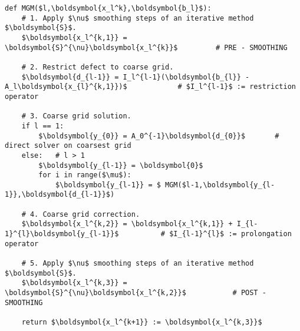 \documentclass{article}
\begin{document}
\pagestyle{plain}
\lstset{language=Python}
\begin{lstlisting}[mathescape=true]
def MGM($l,\boldsymbol{x_l^k},\boldsymbol{b_l}$): 
	# 1. Apply $\nu$ smoothing steps of an iterative method $\boldsymbol{S}$.
	$\boldsymbol{x_l^{k,1}} = \boldsymbol{S}^{\nu}\boldsymbol{x_l^{k}}$			# PRE - SMOOTHING
	
	# 2. Restrict defect to coarse grid.
	$\boldsymbol{d_{l-1}} = I_l^{l-1}(\boldsymbol{b_{l}} - A_l\boldsymbol{x_{l}^{k,1}})$			# $I_l^{l-1}$ := restriction operator
	
	# 3. Coarse grid solution.
	if l == 1:
		$\boldsymbol{y_{0}} = A_0^{-1}\boldsymbol{d_{0}}$ 		# direct solver on coarsest grid
	else:	# l > 1
		$\boldsymbol{y_{l-1}} = \boldsymbol{0}$
		for i in range($\mu$):
			$\boldsymbol{y_{l-1}} = $ MGM($l-1,\boldsymbol{y_{l-1}},\boldsymbol{d_{l-1}}$)
	
	# 4. Coarse grid correction.
	$\boldsymbol{x_l^{k,2}} = \boldsymbol{x_l^{k,1}} + I_{l-1}^{l}\boldsymbol{y_{l-1}}$			 # $I_{l-1}^{l}$ := prolongation operator
	
	# 5. Apply $\nu$ smoothing steps of an iterative method $\boldsymbol{S}$.
	$\boldsymbol{x_l^{k,3}} = \boldsymbol{S}^{\nu}\boldsymbol{x_l^{k,2}}$			# POST - SMOOTHING
	
	return $\boldsymbol{x_l^{k+1}} := \boldsymbol{x_l^{k,3}}$
\end{lstlisting}
\end{document}
